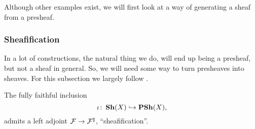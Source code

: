 \documentclass{article}
\begin{document}
Although other examples exist, we will first look
at a way of generating a sheaf from a presheaf.

\subsubsection{Sheafification}
In a lot of constructions, the natural thing we do, will end up
being a presheaf, but not a sheaf in general. So, we will need some way to turn
presheaves into sheaves. For this subsection we largely follow
\cite{stacks-project}.
\begin{prop}
    The fully faithful inclusion
    \begin{equation*}
        \iota \colon \operatorname{\mathbf{Sh}}(X) \hookrightarrow \operatorname{\mathbf{PSh}}(X),
    \end{equation*}
    admits a left adjoint $\mathcal{F} \to \mathcal{F}^\sharp$, ``sheafification''.
\end{prop}
\end{document}

